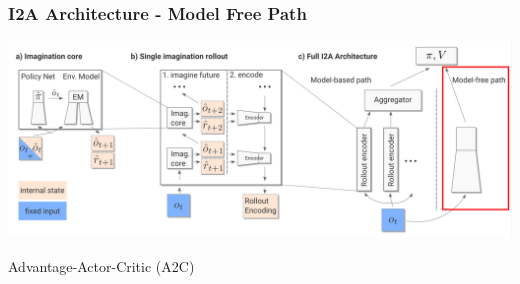 \begin{frame}
    \frametitle{I2A Architecture - Model Free Path}


\includegraphics[width=\columnwidth]{./Images/i2a_all_model_free_path.png}%

\begin{PraesentationAufzaehlung}
	\item Advantage-Actor-Critic (A2C)
\end{PraesentationAufzaehlung}

\end{frame}
\clearpage

